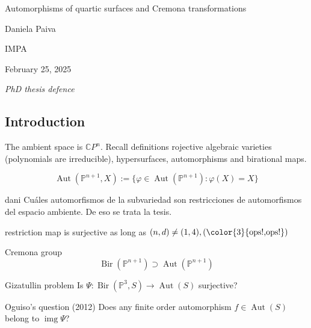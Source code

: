\clearpage{}
{\Huge Automorphisms of quartic surfaces and Cremona transformations}

\hfill{\Large Daniela Paiva}

{\Large \hfill IMPA}

\hfill{\large February 25, 2025

\hfill \textit{PhD thesis defence}}
\subsection{Introduction}

The ambient space is \(\mathbb{C}P^{n}\). Recall definitions rojective algebraic varieties (polynomials are irreducible), hypersurfaces, automorphisms and birational maps.

\[\operatorname{Aut}(\mathbb{P}^{n+1},X):=\{ \varphi\in \operatorname{Aut}(\mathbb{P}^{n+1}):\varphi(X)=X\}\]

\begin{thing7}{dani}\leavevmode
Cuáles automorfismos de la subvariedad son restricciones de automorfismos del espacio ambiente. De eso se trata la tesis.
\end{thing7}

\begin{thm}\leavevmode
	restriction map is surjective as long as \((n,d) \neq (1,4), ({\color{3}{\text{ops!,ops!}}})\)
\end{thm}

Cremona group
\[\operatorname{Bir}(\mathbb{P}^{n+1}) \supset\operatorname{Aut}(\mathbb{P}^{n+1})\]

\begin{thing7}{Gizatullin problem}\leavevmode
Is \(\Psi: \operatorname{Bir}(\mathbb{P}^3,S) \longrightarrow \operatorname{Aut}(S)\) surjective?
\end{thing7}

\begin{thing4}{Oguiso's question (2012)}\leavevmode
Does any finite order automorphism \(f \in \operatorname{Aut}(S)\) belong to \(\operatorname{img}\Psi\)?
\end{thing4}

